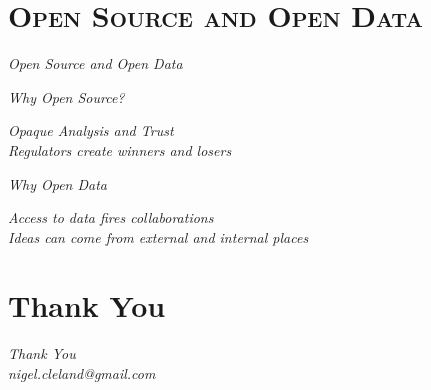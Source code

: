 \documentclass[xcolor=x11names,compress]{beamer}
\renewcommand{\(}{\begin{columns}}
\renewcommand{\)}{\end{columns}}
\newcommand{\<}[1]{\begin{column}{#1}}
\renewcommand{\>}{\end{column}}
\begin{document}
\section{\scshape Open Source and Open Data}
\begin{frame}
\vspace{1.5cm}
\begin{center}
{\Huge\textit{Open Source and Open Data}}
\end{center}
\end{frame}

\begin{frame}
\vspace{1.5cm}
\begin{center}
{\Huge\textit{Why Open Source?}}
\end{center}
\end{frame}

\begin{frame}
\vspace{1.5cm}
\begin{center}
{\Huge\textit{Opaque Analysis and Trust\\
\vspace{0.5cm}
Regulators create winners and losers}}
\end{center}
\end{frame}

\begin{frame}
\vspace{1.5cm}
\begin{center}
{\Huge\textit{Why Open Data}}
\end{center}
\end{frame}

\begin{frame}
\vspace{1.5cm}
\begin{center}
{\Huge\textit{Access to data fires collaborations \\
\vspace{0.5cm}
Ideas can come from external and internal places}}
\end{center}
\end{frame}

\section*{Thank You}
\begin{frame}
\vspace{1.5cm}
\begin{center}
{\Huge\textit{Thank You}} \\
\vspace{0.5cm}
\textit{nigel.cleland@gmail.com}
\end{center}
\end{frame}
\end{document}

